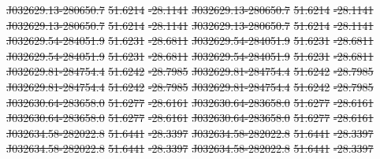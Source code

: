 \documentclass[11pt, a4paper]{book}
\providecommand{\DIFdeltex}[1]{{\protect\color{red}\sout{#1}}}                      %
\providecommand{\DIFdel}[1]{\texorpdfstring{\DIFdeltex{#1}}{}} %
\begin{document}
\DIFdel{J032629.13-280650.7 }%
\DIFdel{51.6214 }%
\DIFdel{-28.1141 }%
\DIFdel{J032629.13-280650.7 }%
\DIFdel{51.6214 }%
\DIFdel{-28.1141 }%
\DIFdel{J032629.13-280650.7 }%
\DIFdel{51.6214 }%
\DIFdel{-28.1141 }%
\DIFdel{J032629.13-280650.7 }%
\DIFdel{51.6214 }%
\DIFdel{-28.1141}%
\DIFdel{J032629.54-284051.9 }%
\DIFdel{51.6231 }%
\DIFdel{-28.6811 }%
\DIFdel{J032629.54-284051.9 }%
\DIFdel{51.6231 }%
\DIFdel{-28.6811 }%
\DIFdel{J032629.54-284051.9 }%
\DIFdel{51.6231 }%
\DIFdel{-28.6811 }%
\DIFdel{J032629.54-284051.9 }%
\DIFdel{51.6231 }%
\DIFdel{-28.6811}%
\DIFdel{J032629.81-284754.4 }%
\DIFdel{51.6242 }%
\DIFdel{-28.7985 }%
\DIFdel{J032629.81-284754.4 }%
\DIFdel{51.6242 }%
\DIFdel{-28.7985 }%
\DIFdel{J032629.81-284754.4 }%
\DIFdel{51.6242 }%
\DIFdel{-28.7985 }%
\DIFdel{J032629.81-284754.4 }%
\DIFdel{51.6242 }%
\DIFdel{-28.7985}%
\DIFdel{J032630.64-283658.0 }%
\DIFdel{51.6277 }%
\DIFdel{-28.6161 }%
\DIFdel{J032630.64-283658.0 }%
\DIFdel{51.6277 }%
\DIFdel{-28.6161 }%
\DIFdel{J032630.64-283658.0 }%
\DIFdel{51.6277 }%
\DIFdel{-28.6161 }%
\DIFdel{J032630.64-283658.0 }%
\DIFdel{51.6277 }%
\DIFdel{-28.6161}%
\DIFdel{J032634.58-282022.8 }%
\DIFdel{51.6441 }%
\DIFdel{-28.3397 }%
\DIFdel{J032634.58-282022.8 }%
\DIFdel{51.6441 }%
\DIFdel{-28.3397 }%
\DIFdel{J032634.58-282022.8 }%
\DIFdel{51.6441 }%
\DIFdel{-28.3397 }%
\DIFdel{J032634.58-282022.8 }%
\DIFdel{51.6441 }%
\DIFdel{-28.3397}%
\end{document}
